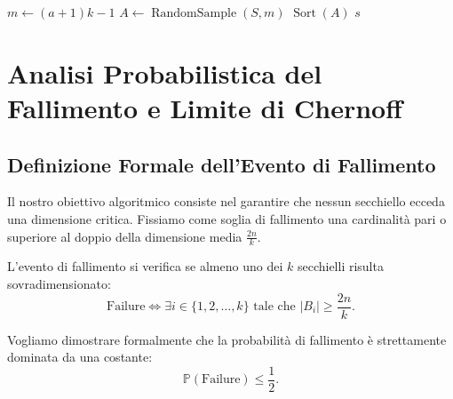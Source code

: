 \begin{algorithm}[H]
  \caption{Selezione dei Pivot tramite Over-Sampling}
  \label{alg:oversampling-pivot-selection}
  $m \leftarrow (a + 1)k - 1$\;
  $A \leftarrow \operatorname{RandomSample}(S, m)$
  $\operatorname{Sort}(A)$
  \Return $s$\;
\end{algorithm}

\FloatBarrier
\section{Analisi Probabilistica del Fallimento e Limite di Chernoff}
\label{sec:failure-analysis-chernoff}

\subsection{Definizione Formale dell'Evento di Fallimento}
Il nostro obiettivo algoritmico consiste nel garantire che nessun secchiello ecceda una dimensione critica. Fissiamo come soglia di fallimento una cardinalità pari o superiore al doppio della dimensione media $\frac{2n}{k}$.

\begin{definition}
L'evento di fallimento si verifica se almeno uno dei $k$ secchielli risulta sovradimensionato:
\begin{equation}
  \text{Failure} \iff \exists i \in \{1, 2, \dots, k\} \text{ tale che } |B_i| \ge \frac{2n}{k}.
  \label{eq:failure-definition}
\end{equation}
\end{definition}

Vogliamo dimostrare formalmente che la probabilità di fallimento è strettamente dominata da una costante:
\begin{equation}
  \mathbb{P}(\text{Failure}) \le \frac{1}{2}.
\end{equation}

